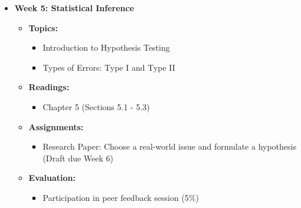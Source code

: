 \documentclass[aspectratio=169]{beamer}
\begin{document}
\begin{frame}[fragile]
\begin{itemize}
        \item \textbf{Week 5: Statistical Inference}
        \begin{itemize}
            \item \textbf{Topics:}
                \begin{itemize}
                    \item Introduction to Hypothesis Testing
                    \item Types of Errors: Type I and Type II
                \end{itemize}
            \item \textbf{Readings:}
                \begin{itemize}
                    \item Chapter 5 (Sections 5.1 - 5.3)
                \end{itemize}
            \item \textbf{Assignments:}
                \begin{itemize}
                    \item Research Paper: Choose a real-world issue and formulate a hypothesis (Draft due Week 6)
                \end{itemize}
            \item \textbf{Evaluation:}
                \begin{itemize}
                    \item Participation in peer feedback session (5\%)
                \end{itemize}
        \end{itemize}
        

\end{itemize}
\end{frame}
\end{document}
